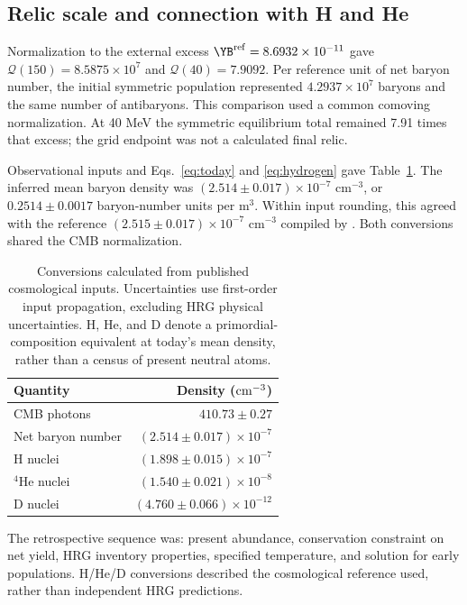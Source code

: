 \subsection{Relic scale and connection with H and He}
Normalization to the external excess $\YB^{\rm ref}=8.6932\times10^{-11}$ gave $\mathcal Q(150)=8.5875\times10^7$ and $\mathcal Q(40)=7.9092$. Per reference unit of net baryon number, the initial symmetric population represented $4.2937\times10^7$ baryons and the same number of antibaryons. This comparison used a common comoving normalization. At 40 MeV the symmetric equilibrium total remained 7.91 times that excess; the grid endpoint was not a calculated final relic.

Observational inputs and Eqs.~\eqref{eq:today} and \eqref{eq:hydrogen} gave Table~\ref{tab:present}. The inferred mean baryon density was $(2.514\pm0.017)\times10^{-7}$ cm$^{-3}$, or $0.2514\pm0.0017$ baryon-number units per m$^3$. Within input rounding, this agreed with the reference $(2.515\pm0.017)\times10^{-7}$ cm$^{-3}$ compiled by \citet{Groom2025}. Both conversions shared the CMB normalization.

\begin{table}[t]
\centering\small
\caption{Conversions calculated from published cosmological inputs. Uncertainties use first-order input propagation, excluding HRG physical uncertainties. H, He, and D denote a primordial-composition equivalent at today's mean density, rather than a census of present neutral atoms.}
\label{tab:present}
\setlength{\tabcolsep}{3pt}\renewcommand{\arraystretch}{1.18}
\begin{tabular}{lr}\toprule
Quantity & Density (${\rm cm^{-3}}$)\\\midrule
CMB photons & $410.73\pm0.27$\\
Net baryon number & $(2.514\pm0.017)\times10^{-7}$\\
H nuclei & $(1.898\pm0.015)\times10^{-7}$\\
$^4$He nuclei & $(1.540\pm0.021)\times10^{-8}$\\
D nuclei & $(4.760\pm0.066)\times10^{-12}$\\
\bottomrule\end{tabular}
\end{table}

The retrospective sequence was: present abundance, conservation constraint on net yield, HRG inventory properties, specified temperature, and solution for early populations. H/He/D conversions described the cosmological reference used, rather than independent HRG predictions.

